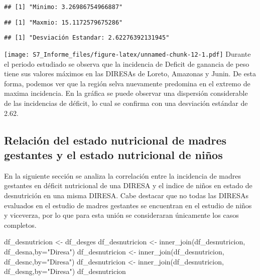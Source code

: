 \documentclass[
]{article}
\newenvironment{Shaded}{\begin{snugshade}}{\end{snugshade}}
\newcommand{\AttributeTok}[1]{\textcolor[rgb]{0.77,0.63,0.00}{#1}}
\newcommand{\FunctionTok}[1]{\textcolor[rgb]{0.00,0.00,0.00}{#1}}
\newcommand{\NormalTok}[1]{#1}
\newcommand{\OtherTok}[1]{\textcolor[rgb]{0.56,0.35,0.01}{#1}}
\newcommand{\StringTok}[1]{\textcolor[rgb]{0.31,0.60,0.02}{#1}}
\begin{document}
\begin{verbatim}
## [1] "Minimo: 3.26986754966887"
\end{verbatim}

\begin{verbatim}
## [1] "Maxmio: 15.1172579675286"
\end{verbatim}

\begin{verbatim}
## [1] "Desviación Estandar: 2.62276392131945"
\end{verbatim}

\texttt{[image: S7\_Informe\_files/figure-latex/unnamed-chunk-12-1.pdf]}
Durante el periodo estudiado se observa que la incidencia de Deficit de
ganancia de peso tiene sus valores máximos en las DIRESAs de Loreto,
Amazonas y Junin. De esta forma, podemos ver que la región selva
nuevamente predomina en el extremo de maxima incidencia. En la gráfica
se puede observar una dispersión considerable de las incidencias de
déficit, lo cual se confirma con una desviación estándar de 2.62.

\hypertarget{relaciuxf3n-del-estado-nutricional-de-madres-gestantes-y-el-estado-nutricional-de-niuxf1os}{%
\subsection{Relación del estado nutricional de madres gestantes y el
estado nutricional de
niños}\label{relaciuxf3n-del-estado-nutricional-de-madres-gestantes-y-el-estado-nutricional-de-niuxf1os}}

En la siguiente sección se analiza la correlación entre la incidencia de
madres gestantes en déficit nutricional de una DIRESA y el indice de
niños en estado de desnutrición en una misma DIRESA. Cabe destacar que
no todas las DIRESAs evaluados en el estudio de madres gestantes se
encuentran en el estudio de niños y viceverza, por lo que para esta
unión se consideraran únicamente los casos completos.

\begin{Shaded}
\begin{Highlighting}[]
\NormalTok{df\_desnutricion }\OtherTok{\textless{}{-}}\NormalTok{ df\_desges}
\NormalTok{df\_desnutricion }\OtherTok{\textless{}{-}} \FunctionTok{inner\_join}\NormalTok{(df\_desnutricion, df\_desna,}\AttributeTok{by=}\StringTok{"Diresa"}\NormalTok{)}
\NormalTok{df\_desnutricion }\OtherTok{\textless{}{-}} \FunctionTok{inner\_join}\NormalTok{(df\_desnutricion, df\_desnc,}\AttributeTok{by=}\StringTok{"Diresa"}\NormalTok{)}
\NormalTok{df\_desnutricion }\OtherTok{\textless{}{-}} \FunctionTok{inner\_join}\NormalTok{(df\_desnutricion, df\_desng,}\AttributeTok{by=}\StringTok{"Diresa"}\NormalTok{)}
\NormalTok{df\_desnutricion}
\end{Highlighting}
\end{Shaded}
\end{document}
